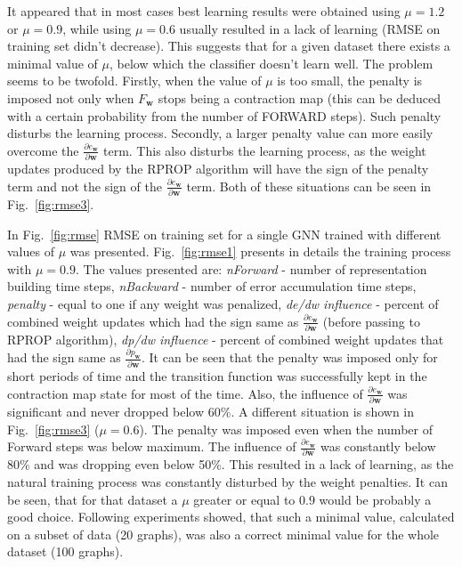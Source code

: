 \documentclass[]{spie}  %
\newcommand{\bm}[1]{\boldsymbol{#1}}
\begin{document}
It appeared that in most cases best learning results were obtained using $\mu = 1.2$ or $\mu = 0.9$, while using $\mu = 0.6$ usually resulted in a lack of learning (RMSE on training set didn't decrease). This suggests that for a given dataset there exists a minimal value of $\mu$, below which the classifier doesn't learn well. The problem seems to be twofold. Firstly, when the value of $\mu$ is too small, the penalty is imposed not only when $F_{\bm{w}}$ stops being a contraction map (this can be deduced with a certain probability from the number of FORWARD steps). Such penalty disturbs the learning process. Secondly, a larger penalty value can more easily overcome the $\frac{\partial e_{\bm{w}}}{\partial \bm{w}}$ term. This also disturbs the learning process, as the weight updates produced by the RPROP algorithm will have the sign of the penalty term and not the sign of the $\frac{\partial e_{\bm{w}}}{\partial \bm{w}}$ term. Both of these situations can be seen in Fig.~\ref{fig:rmse3}.

In Fig.~\ref{fig:rmse} RMSE on training set for a single GNN trained with different values of $\mu$ was presented. Fig.~\ref{fig:rmse1} presents in details the training process with $\mu = 0.9$. The values presented are: \emph{nForward} - number of representation building time steps, \emph{nBackward} - number of error accumulation time steps, \emph{penalty} - equal to one if any weight was penalized, \emph{de/dw influence} - percent of combined weight updates which had the sign same as $\frac{\partial e_{\bm{w}}}{\partial \bm{w}}$ (before passing to RPROP algorithm), \emph{dp/dw influence} - percent of combined weight updates that had the sign same as $\frac{\partial p_{\bm{w}}}{\partial \bm{w}}$. It can be seen that the penalty was imposed only for short periods of time and the transition function was successfully kept in the contraction map state for most of the time. Also, the influence of $\frac{\partial e_{\bm{w}}}{\partial \bm{w}}$ was significant and never dropped below 60\%. A different situation is shown in Fig.~\ref{fig:rmse3} ($\mu = 0.6$). The penalty was imposed even when the number of Forward steps was below maximum. The influence of $\frac{\partial e_{\bm{w}}}{\partial \bm{w}}$ was constantly below 80\% and was dropping even below 50\%. This resulted in a lack of learning, as the natural training process was constantly disturbed by the weight penalties. It can be seen, that for that dataset a $\mu$ greater or equal to $0.9$ would be probably a good choice. Following experiments showed, that such a minimal value, calculated on a subset of data (20 graphs), was also a correct minimal value for the whole dataset (100 graphs).
\end{document}
